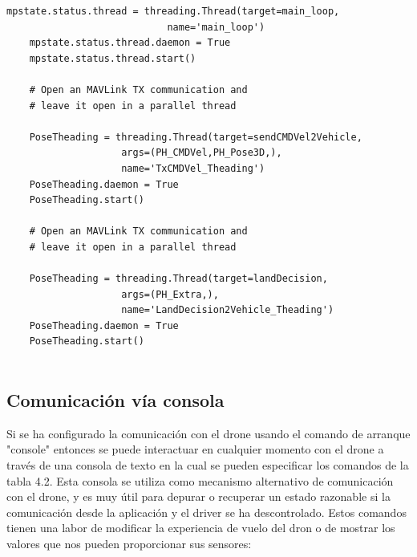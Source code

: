 \begin{lstlisting}[frame=single]
    mpstate.status.thread = threading.Thread(target=main_loop, 
    						name='main_loop')
    mpstate.status.thread.daemon = True
    mpstate.status.thread.start()

    # Open an MAVLink TX communication and 
    # leave it open in a parallel thread
  
    PoseTheading = threading.Thread(target=sendCMDVel2Vehicle, 
    				args=(PH_CMDVel,PH_Pose3D,), 
                    name='TxCMDVel_Theading')
    PoseTheading.daemon = True
    PoseTheading.start()

    # Open an MAVLink TX communication and 
    # leave it open in a parallel thread

    PoseTheading = threading.Thread(target=landDecision, 
    				args=(PH_Extra,), 
                    name='LandDecision2Vehicle_Theading')
    PoseTheading.daemon = True
    PoseTheading.start()
   
\end{lstlisting}

\subsection{Comunicación vía consola}
Si se ha configurado la comunicación con el drone usando el comando de arranque "console" entonces se puede interactuar en cualquier momento con el drone a través de una consola de texto en la cual se pueden especificar los comandos de la tabla 4.2. Esta consola se utiliza como mecanismo alternativo de comunicación con el drone, y es muy útil para depurar o recuperar un estado razonable si la comunicación desde la aplicación y el driver se ha descontrolado. Estos comandos tienen una labor de modificar la experiencia de vuelo del dron o de mostrar los valores que nos pueden proporcionar sus sensores:

